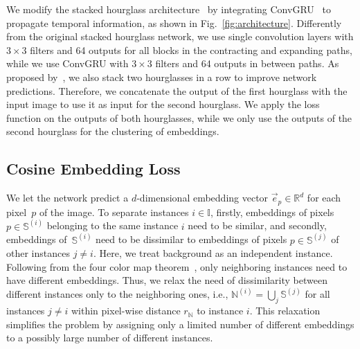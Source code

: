 \documentclass[runningheads,a4paper]{llncs}
\begin{document}
We modify the stacked hourglass architecture~\cite{Newell2016} by integrating \mbox{ConvGRU}~\cite{Ballas2015} to propagate temporal information, as shown in Fig.~\ref{fig:architecture}.
Differently from the original stacked hourglass network, we use single convolution layers with $3\times3$ filters and 64 outputs for all blocks in the contracting and expanding paths, while we use \mbox{ConvGRU} with $3\times3$ filters and 64 outputs in between paths.
As proposed by~\cite{Newell2016}, we also stack two hourglasses in a row to improve network predictions.
Therefore, we concatenate the output of the first hourglass with the input image to use it as input for the second hourglass.
We apply the loss function on the outputs of both hourglasses, while we only use the outputs of the second hourglass for the clustering of embeddings.



\subsection{Cosine Embedding Loss}
\label{subsec:loss}


\newcommand{\setinst}{\mathbb{I}}
\newcommand{\setseg}{\mathbb{S}}
\newcommand{\setsegi}{\setseg^{(i)}}
\newcommand{\setsegj}{\setseg^{(j)}}
\newcommand{\setsegbac}{\setseg^{\textit{bac}}}
\newcommand{\neighseg}{\mathbb{N}}
\newcommand{\neighsegi}{\neighseg^{(i)}}
\newcommand{\neighsegbac}{\neighseg^{\textit{bac}}}
\newcommand{\emb}{\vec{e}}
\newcommand{\meanemb}{\vec{\bar{e}}}
\newcommand{\meanembi}{\meanemb^{(i)}}
\newcommand{\loss}{L}


We let the network predict a $d$-dimensional embedding vector $\emb_p\in\mathbb{R}^d$ for each pixel~$p$ of the image. %
To separate instances $i\in\setinst$, firstly, embeddings of pixels $p\in\setsegi$ belonging to the same instance $i$ need to be similar, and secondly, embeddings of~$\setsegi$ need to be dissimilar to embeddings of pixels $p\in\setsegj$ of other instances $j\neq i$. %
Here, we treat background as an independent instance.
Following from the four color map theorem~\cite{Appel1976}, only neighboring instances need to have different embeddings.
Thus, we relax the need of dissimilarity between different instances only to the neighboring ones, i.e., $\neighsegi = \bigcup_j\setsegj$ for all instances $j\neq i$ within pixel-wise distance $r_{\mathbb{N}}$ to instance $i$.
This relaxation simplifies the problem by assigning only a limited number of different embeddings to a possibly large number of different instances.
\end{document}
